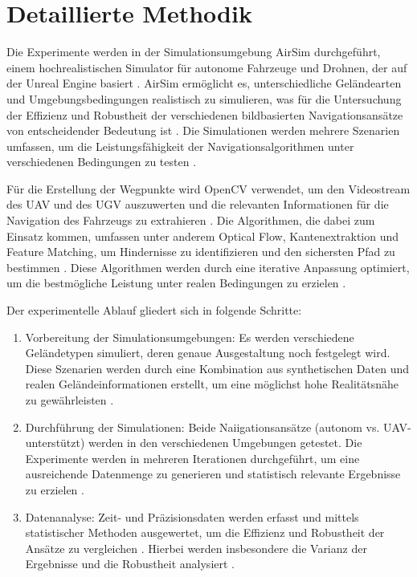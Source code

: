 
\section{Detaillierte Methodik}

Die Experimente werden in der Simulationsumgebung \gls{AirSim} durchgeführt, einem hochrealistischen Simulator für autonome Fahrzeuge und Drohnen, der auf der \gls{Unreal Engine} basiert \cite{airsim2017fsr}. 
\gls{AirSim} ermöglicht es, unterschiedliche Geländearten und Umgebungsbedingungen realistisch zu simulieren, was für die Untersuchung der Effizienz und Robustheit der verschiedenen bildbasierten Navigationsansätze von entscheidender Bedeutung ist \cite{mapless:ugv:navigation}. 
Die Simulationen werden mehrere Szenarien umfassen, um die Leistungsfähigkeit der Navigationsalgorithmen unter verschiedenen Bedingungen zu testen \cite{multi:objective:ugv:navigation}.

Für die Erstellung der Wegpunkte wird \gls{OpenCV} verwendet, um den Videostream des \ac{UAV} und des \ac{UGV} auszuwerten und die relevanten Informationen für die Navigation des Fahrzeugs zu extrahieren \cite{autonomous:flight:uwb:positioning}. 
Die Algorithmen, die dabei zum Einsatz kommen, umfassen unter anderem Optical Flow, Kantenextraktion und \gls{Feature Matching}, um Hindernisse zu identifizieren und den sichersten Pfad zu bestimmen \cite{image:processing:uav:autonomous}. 
Diese Algorithmen werden durch eine iterative Anpassung optimiert, um die bestmögliche Leistung unter realen Bedingungen zu erzielen \cite{ugv:coverage:energy:efficient}.

Der experimentelle Ablauf gliedert sich in folgende Schritte:

\begin{enumerate}
    \item Vorbereitung der Simulationsumgebungen: Es werden verschiedene Geländetypen simuliert, deren genaue Ausgestaltung noch festgelegt wird. Diese Szenarien werden durch eine Kombination aus synthetischen Daten und realen Geländeinformationen erstellt, um eine möglichst hohe Realitätsnähe zu gewährleisten \cite{ugv:system:indonesia}.
    
    \item Durchführung der Simulationen: Beide Naiigationsansätze (autonom vs. \ac{UAV}-unterstützt) werden in den verschiedenen Umgebungen getestet. Die Experimente werden in mehreren Iterationen durchgeführt, um eine ausreichende Datenmenge zu generieren und statistisch relevante Ergebnisse zu erzielen \cite{ugv:uav:cooperative:ranging}.
    
    \item Datenanalyse: Zeit- und Präzisionsdaten werden erfasst und mittels statistischer Methoden ausgewertet, um die Effizienz und Robustheit der Ansätze zu vergleichen \cite{ugv:resupply:scenario}. Hierbei werden insbesondere die Varianz der Ergebnisse und die Robustheit analysiert \cite{mil:ugv:attitudes}.
\end{enumerate}

